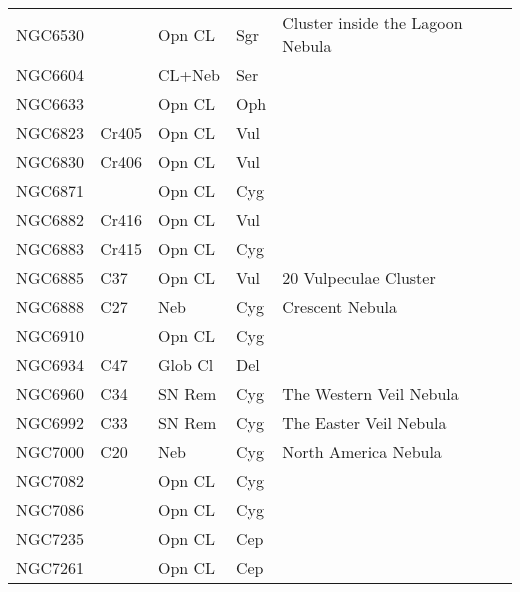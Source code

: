 \begin{longtable}{ p{0.7in}  p{1.0in}  p{0.6in}  p{0.9in}  p{5.1in} }
NGC6530 &  & Opn CL & Sgr & Cluster inside the Lagoon Nebula \\ 
NGC6604 &  & CL+Neb & Ser &  \\ 
NGC6633 &  & Opn CL & Oph &  \\ 
NGC6823 & Cr405 & Opn CL & Vul &  \\ 
NGC6830 & Cr406 & Opn CL & Vul &  \\ 
NGC6871 &  & Opn CL & Cyg &  \\ 
NGC6882 & Cr416 & Opn CL & Vul &  \\ 
NGC6883 & Cr415 & Opn CL & Cyg &  \\ 
NGC6885 & C37 & Opn CL & Vul & 20 Vulpeculae Cluster \\ 
NGC6888 & C27 & Neb & Cyg & Crescent Nebula \\ 
NGC6910 &  & Opn CL & Cyg &  \\ 
NGC6934 & C47 & Glob Cl & Del &  \\ 
NGC6960 & C34 & SN Rem & Cyg & The Western Veil Nebula \\ 
NGC6992 & C33 & SN Rem & Cyg & The Easter Veil Nebula \\ 
NGC7000 & C20 & Neb & Cyg & North America Nebula \\ 
NGC7082 &  & Opn CL & Cyg &  \\ 
NGC7086 &  & Opn CL & Cyg &  \\ 
NGC7235 &  & Opn CL & Cep &  \\ 
NGC7261 &  & Opn CL & Cep &  \\ 
\hline 
\end{longtable} 
